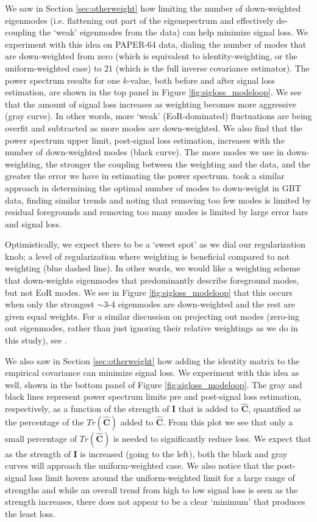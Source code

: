 \documentclass[preprint2,numberedappendix,tighten]{aastex6}  %
\begin{document}
We saw in Section \ref{sec:otherweight} how limiting the number of down-weighted eigenmodes (i.e. flattening out part of the 
eigenspectrum and effectively de-coupling the `weak' eigenmodes from the data) can help minimize signal loss. We experiment with this idea on PAPER-64 data, dialing the number of modes 
that are down-weighted from zero (which is equivalent to identity-weighting, or the uniform-weighted case) to $21$ (which is the full inverse 
covariance estimator). The power spectrum results for one $k$-value, both before and after signal loss 
estimation, are shown in the top panel in Figure \ref{fig:sigloss_modeloop}. We see that the amount of signal loss increases as weighting 
becomes more aggressive (gray curve). In other words, more `weak' (EoR-dominated) fluctuations are being overfit and 
subtracted as more modes are down-weighted. We also find that the power spectrum upper limit, post-signal loss estimation, 
increases with the number of down-weighted modes (black curve). The more modes we use in down-weighting, the stronger the coupling between the weighting and the data, and the greater the error we have in estimating the power spectrum. \citet{switzer_et_al2013} took a similar approach in determining the optimal number of modes to down-weight in GBT data, finding similar trends and noting that removing too few modes is limited by residual foregrounds and removing too many modes is limited by large error bars and signal loss.

Optimistically, we expect there to be a `sweet spot' as we dial our regularization knob; a level of regularization where weighting 
is beneficial compared to not weighting (blue dashed line). In other words, we would like a weighting scheme that down-weights eigenmodes that predominantly describe foreground modes, but not EoR modes. We see in Figure \ref{fig:sigloss_modeloop} that this occurs when 
only the strongest $\sim3$-$4$ eigenmodes are down-weighted and the rest are given equal weights. For a similar discussion on projecting out modes (zero-ing out eigenmodes, rather than just ignoring their relative weightings as we do in this study), see \citet{switzer_et_al2013}. 

We also saw in Section \ref{sec:otherweight} how adding the identity matrix to the empirical covariance can minimize signal loss. We experiment with this idea as well, shown in the bottom panel of Figure \ref{fig:sigloss_modeloop}. The gray and black lines represent power spectrum limits pre and post-signal loss estimation, respectively, as a function of the strength of $\textbf{I}$ that is added to $\widehat{\textbf{C}}$, quantified as the percentage of the $Tr(\widehat{\textbf{C}})$ added to $\widehat{\textbf{C}}$. From this plot we see that only a small percentage of $Tr(\widehat{\textbf{C}})$ is needed to significantly reduce loss. We expect that as the strength of $\textbf{I}$ is increased (going to the left), both the black and gray curves will approach the uniform-weighted case. We also notice that the post-signal loss limit hovers around the uniform-weighted limit for a large range of strengths and while an overall trend from high to low signal loss is seen as the strength increases, there does not appear to be a clear `minimum' that produces the least loss.
\end{document}
